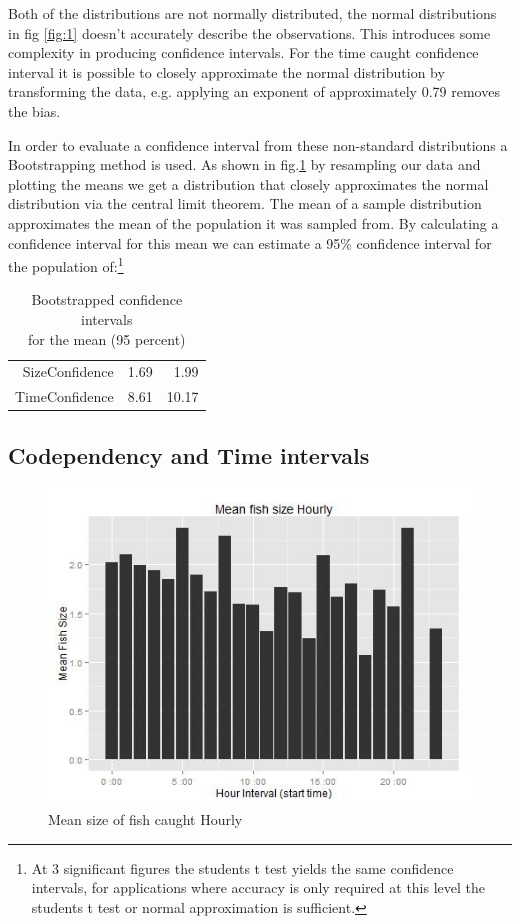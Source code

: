 \documentclass{article}
\begin{document}
Both of the distributions are not normally distributed, the normal distributions in fig \ref{fig:1} doesn't accurately describe the observations. This introduces some complexity in producing confidence intervals. For the time caught confidence interval it is possible to closely approximate the normal distribution by transforming the data, e.g. applying an exponent of approximately 0.79 removes the bias.

In order to evaluate a confidence interval from these non-standard distributions a Bootstrapping method is used. As shown in fig.\ref{fig:three} by resampling our data and plotting the means we get a distribution that closely approximates the normal distribution via the central limit theorem. The mean of a sample distribution approximates the mean of the population it was sampled from. By calculating a confidence interval for this mean we can estimate a 95\% confidence interval for the population of:\footnote{At 3 significant figures the students t test yields the same confidence intervals, for applications where accuracy is only required at this level the students t test or normal approximation is sufficient.}

\begin{table}[ht]
\centering
\begin{tabular}{rrr}
  \hline
  \hline
SizeConfidence & 1.69 & 1.99 \\ 
  TimeConfidence & 8.61 & 10.17 \\ 
   \hline
\end{tabular}
\caption{Bootstrapped confidence intervals \\ for the mean (95 percent)} 
\end{table}
\subsection{Codependency and Time intervals}



\begin{figure}
  \includegraphics[width=0.9\linewidth]{figure4.jpg}
  \caption{Mean size of fish caught Hourly}
  \label{fig:three}
\end{figure}
\end{document}
